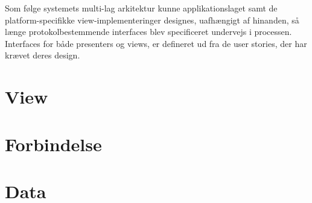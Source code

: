 Som følge systemets multi-lag arkitektur kunne applikationslaget samt de platform-specifikke view-implementeringer
designes, uafhængigt af hinanden, så længe protokolbestemmende interfaces blev specificeret undervejs i processen. Interfaces for både presenters og views, er defineret ud fra de user stories, der har krævet deres design.



\section{View}










\section{Forbindelse}



\section{Data}


